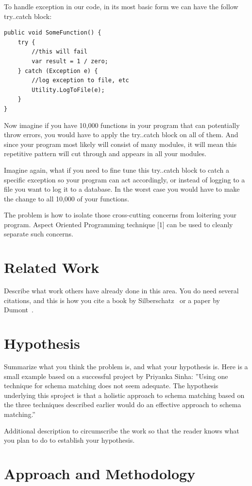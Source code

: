 To handle exception in our code, in its most basic form we can have the follow try..catch block:
\begin{verbatim}
public void SomeFunction() {
    try {
		//this will fail
		var result = 1 / zero;
    } catch (Exception e) {
		//log exception to file, etc
        Utility.LogToFile(e);
    }
}
\end{verbatim}

Now imagine if you have 10,000 functions in your program that can potentially throw errors, you would have to apply the try..catch block on all of them. And since your program most likely will consist of many modules, it will mean this repetitive pattern will cut through and appears in all your modules.

Imagine again, what if you need to fine tune this try..catch block to catch a specific exception so your program can act accordingly, or instead of logging to a file you want to log it to a database. In the worst case you would have to make the change to all 10,000 of your functions.

The problem is how to isolate those cross-cutting concerns from loitering your program. Aspect Oriented Programming technique [1] can be used to cleanly separate such concerns.

\section{Related Work}
Describe what work others have already done in this area. You do need
several citations, and this is how you cite a book by
Silberschatz~\cite{Silberschatz05-text} or a paper by
Dumont~\cite{Dumont2007-robots}.

\section{Hypothesis}
Summarize what you think the problem is, and what your hypothesis
is. Here is a small example based on a successful project by Priyanka
Sinha: ''Using one technique for schema matching does not seem
adequate. The hypothesis underlying this sproject is that a holistic
approach to schema matching based on the three techniques described
earlier would do an effective approach to schema matching.''

Additional description to circumscribe the work so that the reader
knows what you plan to do to establish your hypothesis.

\section{Approach and Methodology}
